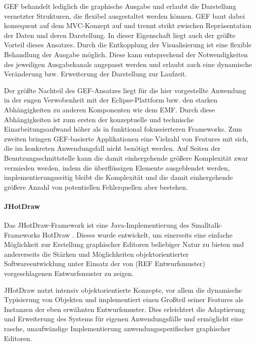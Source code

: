\gls{GEF} behandelt lediglich die graphische Ausgabe und erlaubt die Darstellung vernetzter Strukturen, die flexibel ausgestaltet werden können. \gls{GEF} baut dabei konsequent auf dem \gls{MVC}-Konzept \citep{Krasner88} auf und trennt strikt zwischen Repräsentation der Daten und deren Darstellung. In dieser Eigenschaft liegt auch der größte Vorteil dieses Ansatzes. Durch die Entkopplung der Visualisierung ist eine flexible Behandlung der Ausgabe möglich. Diese kann entsprechend der Notwendigkeiten des jeweiligen Ausgabekanals angepasst werden und erlaubt auch eine dynamische Veränderung bzw. Erweiterung der Darstellung zur Laufzeit.

Der größte Nachteil des \gls{GEF}-Ansatzes liegt für die hier vorgestellte Anwendung in der engen Verwobenheit mit der Eclipse-Plattform bzw. den starken Abhängigkeiten zu anderen Komponenten wie dem \gls{EMF}. Durch diese Abhängigkeiten ist zum ersten der konzeptuelle und technische Einarbeitungsaufwand höher als in funktional fokussierteren Frameworks. Zum zweiten bringen GEF-basierte Applikationen eine Vielzahl von Features mit sich, die im konkreten Anwendungsfall nicht benötigt werden. Auf Seiten der Benutzungsschnittstelle kann die damit einhergehende größere Komplexität zwar vermieden werden, indem die überflüssigen Elemente ausgeblendet werden, implementierungsseitig bleibt die Komplexität und die damit einhergehende größere Anzahl von potentiellen Fehlerquellen aber bestehen.

\paragraph{JHotDraw} %
\label{par:jhotdraw}

Das JHotDraw-Framework \citep{Gamma96} ist eine Java-Implementierung des Smalltalk-Frameworks HotDraw \citep{Brant95}. Dieses wurde entwickelt, um einerseits eine einfache Möglichkeit zur Erstellung graphischer Editoren beliebiger Natur zu bieten und andererseits die Stärken und Möglichkeiten objektorientierter Softwareentwicklung unter Einsatz der von (REF Entwurfsmuster) vorgeschlagenen Entwurfsmuster zu zeigen.

JHotDraw nutzt intensiv objektorientierte Konzepte, vor allem die dynamische Typisierung von Objekten und implementiert einen Großteil seiner Features als Instanzen der eben erwähnten Entwurfsmuster. Dies erleichtert die Adaptierung und Erweiterung des Systems für eigenen Anwendungsfälle und ermöglicht eine rasche, unaufwändige Implementierung anwendungsspezifischer graphischer Editoren.

